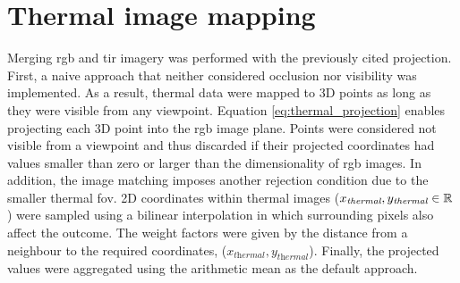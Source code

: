 \section{Thermal image mapping}

Merging \acrshort{rgb} and \acrshort{tir} imagery was performed with the previously cited projection. First, a naive approach that neither considered occlusion nor visibility was implemented. As a result, thermal data were mapped to 3D points as long as they were visible from any viewpoint. Equation \ref{eq:thermal_projection} enables projecting each 3D point into the \acrshort{rgb} image plane. Points were considered not visible from a viewpoint and thus discarded if their projected coordinates had values smaller than zero or larger than the dimensionality of \acrshort{rgb} images. In addition, the image matching imposes another rejection condition due to the smaller thermal \acrshort{fov}. 2D coordinates within thermal images ($x_{\textit{thermal}}, y_{\textit{thermal}} \in \mathbb{R}$) were sampled using a bilinear interpolation in which surrounding pixels also affect the outcome. The weight factors were given by the distance from a neighbour to the required coordinates, ($x_{\textit{thermal}}, y_{\textit{thermal}}$). Finally, the projected values were aggregated using the arithmetic mean as the default approach.

